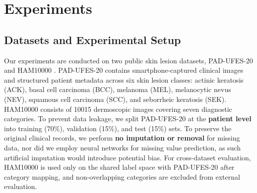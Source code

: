 \documentclass[preprint,12pt]{elsarticle}
\begin{document}

\section{Experiments}

\subsection{Datasets and Experimental Setup}


Our experiments are conducted on two public skin lesion datasets, PAD-UFES-20 and HAM10000 \cite{tschandl2018ham10000,pacheco2020padufes20}. PAD-UFES-20 contains smartphone-captured clinical images and structured patient metadata across six skin lesion classes: actinic keratosis (ACK), basal cell carcinoma (BCC), melanoma (MEL), melanocytic nevus (NEV), squamous cell carcinoma (SCC), and seborrheic keratosis (SEK). HAM10000 consists of 10015 dermoscopic images covering seven diagnostic categories. To prevent data leakage, we split PAD-UFES-20 at the \textbf{patient level} into training (70\%), validation (15\%), and test (15\%) sets. To preserve the original clinical records, we perform \textbf{no imputation or removal} for missing data, nor did we employ neural networks for missing value prediction, as such artificial imputation would introduce potential bias\cite{vo2026explainability,ryan2025does,el2026moving}. For cross-dataset evaluation, HAM10000 is used only on the shared label space with PAD-UFES-20 after category mapping, and non-overlapping categories are excluded from external evaluation.
\end{document}
